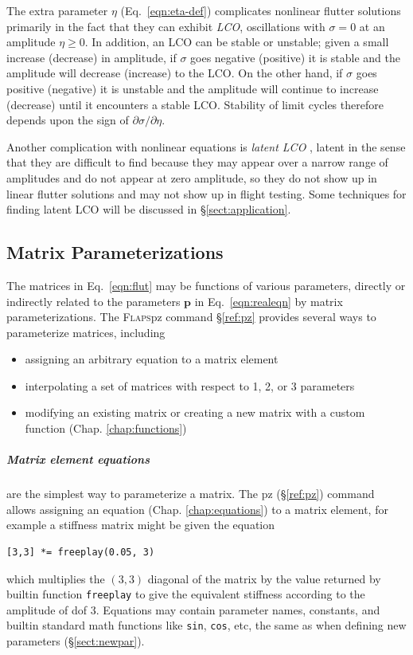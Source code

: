 \documentclass[11pt,openany,twoside]{book}
\numberwithin{equation}{section}		%
\newcommand{\Cmd}[1]{{\sf #1}}
\newcommand{\Newterm}[1]{{\em #1}}	%
\newcommand{\Code}[1]{{\small\tt #1}}
\newcommand{\Flaps}{\textsc{Flaps\:}}
\newcommand{\Vector}[1]{\boldsymbol{#1}}
\newcommand{\Sectref}[1]{\S\ref{#1}}
\newcommand{\Chapref}[1]{Chap. \ref{#1}}
\newcommand{\Eqn}[1]{Eq.\ \ref{#1}}  %
\begin{document}
The extra parameter $\eta$ (\Eqn{eqn:eta-def}) complicates nonlinear
flutter solutions primarily in the fact that they can exhibit \Newterm{LCO},
 oscillations with $\sigma=0$
at an amplitude $\eta \ge 0$. In addition, an LCO can be stable or unstable;
given a small increase (decrease) in amplitude, if $\sigma$ goes
negative (positive) it is stable and the amplitude will decrease
(increase) to the LCO. On the other hand, if $\sigma$ goes positive
(negative) it is unstable and the amplitude will continue to increase
(decrease) until it encounters a stable LCO.
Stability of limit cycles therefore depends upon the sign of
$\partial \sigma/\partial \eta$.
\par
Another complication with nonlinear equations is
\Newterm{latent LCO} \cite{meyer2021latent},
latent in the sense that they are difficult to find
because they may appear over a narrow range of amplitudes and
do not appear at zero amplitude, so they do not show up in linear
flutter solutions and may not show up in flight testing.
Some techniques for finding latent LCO will be discussed in
\Sectref{sect:application}.


\subsection{Matrix Parameterizations}\label{sect:pz}
The matrices in \Eqn{eqn:flut} may be functions of various parameters, directly
or indirectly related to the parameters $\Vector{p}$ in \Eqn{eqn:realeqn} by
matrix parameterizations.
The \Flaps \Cmd{pz} command \Sectref{ref:pz} provides several ways to
parameterize matrices, including
\begin{itemize}
\item assigning an arbitrary equation to a matrix element
\item interpolating a set of matrices with respect to 1, 2, or 3 parameters
\item modifying an existing matrix or creating a new matrix
      with a custom function (\Chapref{chap:functions})
\end{itemize}

\subparagraph{Matrix element equations} are the simplest way
to parameterize a matrix. The \Cmd{pz} (\Sectref{ref:pz}) command allows assigning
an equation (\Chapref{chap:equations}) to a matrix element,
for example a stiffness matrix might be given the equation
\begin{lstlisting}
[3,3] *= freeplay(0.05, 3)
\end{lstlisting}
which multiplies the $(3,3)$ diagonal of the matrix by the value
returned by builtin function \Code{freeplay} to give
the equivalent stiffness according to the amplitude of dof 3.
Equations may contain parameter names, constants, and builtin
standard math functions like \Code{sin}, \Code{cos}, etc,
the same as when defining new parameters (\Sectref{sect:newpar}).
\end{document}
